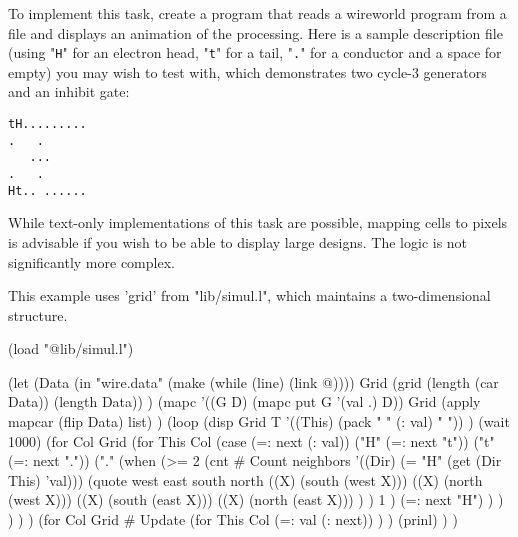 To implement this task, create a program that reads a wireworld program
from a file and displays an animation of the processing. Here is a
sample description file (using "\texttt{H}" for an electron head,
"\texttt{t}" for a tail, "\texttt{.}" for a conductor and a space for
empty) you may wish to test with, which demonstrates two cycle-3
generators and an inhibit gate:

\begin{verbatim}
tH.........
.   .
   ...
.   .
Ht.. ......
\end{verbatim}

While text-only implementations of this task are possible, mapping cells
to pixels is advisable if you wish to be able to display large designs.
The logic is not significantly more complex.



\begin{wideverbatim}

This example uses 'grid' from "lib/simul.l", which maintains a two-dimensional
structure.

(load "@lib/simul.l")

(let
   (Data (in "wire.data" (make (while (line) (link @))))
      Grid (grid (length (car Data)) (length Data)) )
   (mapc
      '((G D) (mapc put G '(val .) D))
      Grid
      (apply mapcar (flip Data) list) )
   (loop
      (disp Grid T
         '((This) (pack " " (: val) " ")) )
      (wait 1000)
      (for Col Grid
         (for This Col
            (case (=: next (: val))
               ("H" (=: next "t"))
               ("t" (=: next "."))
               ("."
                  (when
                     (>=
                        2
                        (cnt # Count neighbors
                           '((Dir) (= "H" (get (Dir This) 'val)))
                           (quote
                              west east south north
                              ((X) (south (west X)))
                              ((X) (north (west X)))
                              ((X) (south (east X)))
                              ((X) (north (east X))) ) )
                        1 )
                     (=: next "H") ) ) ) ) )
      (for Col Grid  # Update
         (for This Col
            (=: val (: next)) ) )
      (prinl) ) )

\end{wideverbatim}

